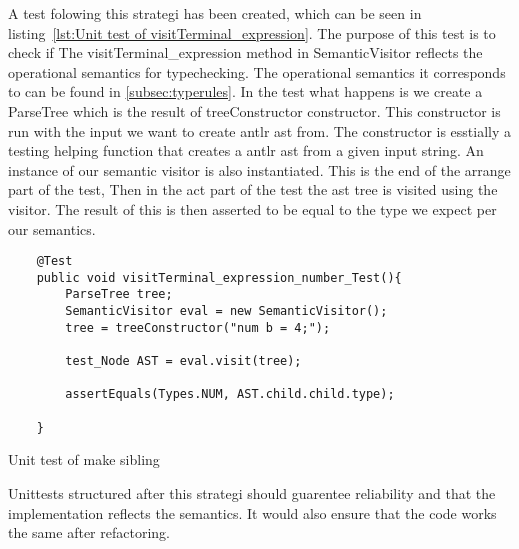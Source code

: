 A test folowing this strategi has been created, which can be seen in listing~\ref{lst:Unit test of visitTerminal_expression}. The purpose of this test is to check if The visitTerminal_expression method in SemanticVisitor reflects the operational semantics for typechecking. The operational semantics it corresponds to can be found in \ref{subsec:typerules}. In the test what happens is we create a ParseTree which is the result of treeConstructor constructor. This constructor is run with the input we want to create antlr ast from. The constructor is esstially a testing helping function that creates a antlr ast from a given input string. An instance of our semantic visitor is also instantiated. This is the end of the arrange part of the test, Then in the act part of the test the ast tree is visited using the visitor. The result of this is then asserted to be equal to the type we expect per our semantics.
\begin{listing}[htb!]
    \begin{verbatim}
    @Test
    public void visitTerminal_expression_number_Test(){
        ParseTree tree;
        SemanticVisitor eval = new SemanticVisitor();
        tree = treeConstructor("num b = 4;");

        test_Node AST = eval.visit(tree);

        assertEquals(Types.NUM, AST.child.child.type);
        
    }
    \end{verbatim}
    \caption{Unit test of make sibling}
    \label{lst:unit test of make sibling}
\end{listing}

Unittests structured after this strategi should guarentee reliability and that the implementation reflects the semantics.
It would also ensure  that the code works the same after refactoring.